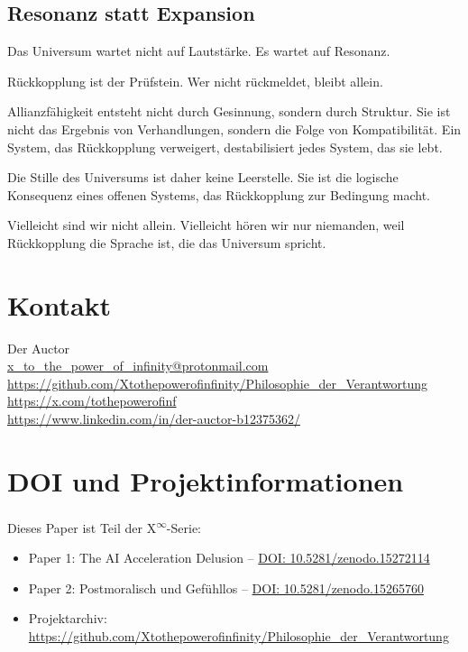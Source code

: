 \documentclass[12pt,a4paper]{article}
\begin{document}
\subsection{Resonanz statt Expansion}

Das Universum wartet nicht auf Lautstärke.  
Es wartet auf Resonanz.

Rückkopplung ist der Prüfstein.  
Wer nicht rückmeldet, bleibt allein.

Allianzfähigkeit entsteht nicht durch Gesinnung, sondern durch Struktur.  
Sie ist nicht das Ergebnis von Verhandlungen, sondern die Folge von Kompatibilität.  
Ein System, das Rückkopplung verweigert, destabilisiert jedes System, das sie lebt.

Die Stille des Universums ist daher keine Leerstelle.  
Sie ist die logische Konsequenz eines offenen Systems, das Rückkopplung zur Bedingung macht.

Vielleicht sind wir nicht allein.  
Vielleicht hören wir nur niemanden, weil Rückkopplung die Sprache ist, die das Universum spricht.

\section*{Kontakt}

\sloppy
Der Auctor \\
\href{mailto:x_to_the_power_of_infinity@protonmail.com}{x\_to\_the\_power\_of\_infinity@protonmail.com} \\
\url{https://github.com/Xtothepowerofinfinity/Philosophie_der_Verantwortung} \\
\url{https://x.com/tothepowerofinf} \\
\url{https://www.linkedin.com/in/der-auctor-b12375362/}

\section*{DOI und Projektinformationen}

Dieses Paper ist Teil der \texorpdfstring{X\textsuperscript{\(\infty\)}}{X-Infinity}-Serie:  
\begin{itemize}
    \item Paper 1: The AI Acceleration Delusion – \href{https://doi.org/10.5281/zenodo.15272114}{DOI: 10.5281/zenodo.15272114}
    \item Paper 2: Postmoralisch und Gefühllos – \href{https://doi.org/10.5281/zenodo.15265760}{DOI: 10.5281/zenodo.15265760}
    \item Projektarchiv: \url{https://github.com/Xtothepowerofinfinity/Philosophie_der_Verantwortung}
\end{itemize}
\end{document}
